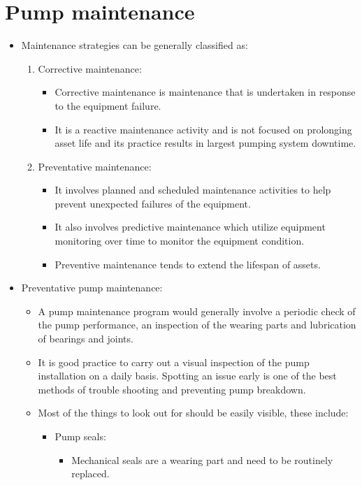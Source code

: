 \section{Pump maintenance} 
\begin{itemize}
\item Maintenance strategies can be generally classified as:
\begin{enumerate}
\item Corrective maintenance: 
\begin{itemize}
\item Corrective maintenance is maintenance that is undertaken in response to the equipment failure.
\item It is a reactive maintenance activity and is not focused on prolonging asset life and its practice results in largest pumping system downtime.
\end{itemize}
\item Preventative maintenance:
\begin{itemize}
\item It involves planned and scheduled maintenance activities to help prevent unexpected failures of the equipment. 
\item It also involves predictive maintenance which utilize equipment monitoring over time to monitor the equipment condition.
\item Preventive maintenance tends to extend the lifespan of assets.
\end{itemize}
\end{enumerate}
\item Preventative pump maintenance:\\
\begin{itemize}
\item A pump maintenance program would generally involve a periodic check of the pump performance, an inspection of the wearing parts and lubrication of bearings and joints. 
\item It is good practice to carry out a visual inspection of the pump installation on a daily basis. Spotting an issue early is one of the best methods of trouble shooting and preventing pump breakdown.
\item Most of the things to look out for should be easily visible, these include:
\begin{itemize}
\item Pump seals:
\begin{itemize}
\item Mechanical seals are a wearing part and need to be routinely replaced.

\end{itemize}
\end{itemize}
\end{itemize}
\end{itemize}
